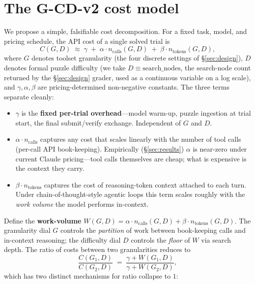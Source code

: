 \documentclass[11pt,letterpaper]{article}
\begin{document}
\section{The G-CD-v2 cost model}
\label{sec:model}

We propose a simple, falsifiable cost decomposition. For a fixed
task, model, and pricing schedule, the API cost of a single solved
trial is
\begin{equation}
\label{eq:gcdv2}
  C(G, D)
  \;\approx\;
  \gamma
  \;+\;
  \alpha \cdot n_{\text{calls}}(G, D)
  \;+\;
  \beta  \cdot n_{\text{tokens}}(G, D),
\end{equation}
where $G$ denotes toolset granularity (the four discrete settings of
\S\ref{sec:design}), $D$ denotes formal puzzle difficulty (we take
$D \equiv \text{search\_nodes}$, the search-node count returned by
the \S\ref{sec:design} grader, used as a continuous variable on a
log scale), and $\gamma, \alpha, \beta$ are pricing-determined
non-negative constants. The three terms separate cleanly:

\begin{itemize}
  \item $\gamma$ is the \textbf{fixed per-trial overhead}---model
    warm-up, puzzle ingestion at trial start, the final
    submit/verify exchange. Independent of $G$ and $D$.
  \item $\alpha \cdot n_{\text{calls}}$ captures any cost that
    scales linearly with the number of tool calls (per-call API
    book-keeping). Empirically (\S\ref{sec:results}) $\alpha$ is
    near-zero under current Claude pricing---tool calls themselves
    are cheap; what is expensive is the context they carry.
  \item $\beta \cdot n_{\text{tokens}}$ captures the cost of
    reasoning-token context attached to each turn. Under
    chain-of-thought-style agentic loops this term scales roughly
    with the \emph{work volume} the model performs in-context.
\end{itemize}

Define the \textbf{work-volume}
$W(G, D) = \alpha \cdot n_{\text{calls}}(G, D) + \beta \cdot
n_{\text{tokens}}(G, D)$. The granularity dial $G$ controls the
\emph{partition} of work between book-keeping calls and in-context
reasoning; the difficulty dial $D$ controls the \emph{floor} of $W$
via search depth. The ratio of costs between two granularities
reduces to
\begin{equation}
  \frac{C(G_1, D)}{C(G_2, D)}
  \;=\;
  \frac{\gamma + W(G_1, D)}{\gamma + W(G_2, D)},
\end{equation}
which has two distinct mechanisms for ratio collapse to $1$:
\end{document}
